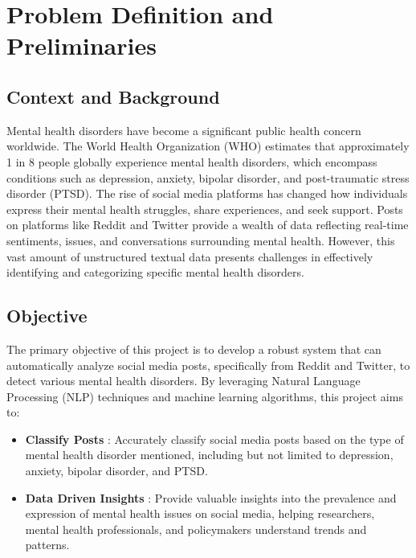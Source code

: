 
\section{Problem Definition and Preliminaries}

\begin{comment}
    State the problem you have solved. Define the boundaries of your project. What was included (scope) and what was not (exclusions)?
\vspace{.1in}

\noindent
Briefly explain the methods you used to conduct your research or complete the project. Were there specific tools, techniques or libraries employed?
\end{comment}

\subsection{Context and Background}
\noindent
Mental health disorders have become a significant public health concern worldwide. The World Health Organization (WHO) estimates that approximately 1 in 8 people globally experience mental health disorders, which encompass conditions such as depression, anxiety, bipolar disorder, and post-traumatic stress disorder (PTSD). The rise of social media platforms has changed how individuals express their mental health struggles, share experiences, and seek support. Posts on platforms like Reddit and Twitter provide a wealth of data reflecting real-time sentiments, issues, and conversations surrounding mental health. However, this vast amount of unstructured textual data presents challenges in effectively identifying and categorizing specific mental health disorders.

\subsection{Objective}
\noindent
The primary objective of this project is to develop a robust system that can automatically analyze social media posts, specifically from Reddit and Twitter, to detect various mental health disorders. By leveraging Natural Language Processing (NLP) techniques and machine learning algorithms, this project aims to:
\begin{itemize}
    \item \textbf{Classify Posts} :
    \noindent
    Accurately classify social media posts based on the type of mental health disorder mentioned, including but not limited to depression, anxiety, bipolar disorder, and PTSD.

    \item \textbf{Data Driven Insights} :
    \noindent
    Provide valuable insights into the prevalence and expression of mental health issues on social media, helping researchers, mental health professionals, and policymakers understand trends and patterns.
\end{itemize}

